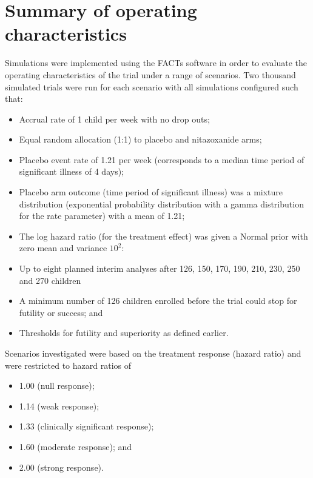 \documentclass[a4paper]{article}
\begin{document}
\section{Summary of operating characteristics}\label{summary-of-operating-characteristics}

Simulations were implemented using the FACTs software \cite{facts} in order to evaluate the operating characteristics of the trial under a range of scenarios.
Two thousand simulated trials were run for each scenario with all simulations configured such that:

\begin{itemize}
    \item Accrual rate of 1 child per week with no drop outs;
    \item Equal random allocation (1:1) to placebo and nitazoxanide arms;
    \item Placebo event rate of 1.21 per week (corresponds to a median time period of significant illness of 4 days);
    \item Placebo arm outcome (time period of significant illness) was a mixture distribution (exponential probability distribution with a gamma distribution for the rate parameter) with a mean of 1.21;
    \item The log hazard ratio (for the treatment effect) was given a Normal prior with zero mean and variance $10^2$: 
    \item Up to eight planned interim analyses after 126, 150, 170, 190, 210, 230, 250 and 270 children 
    \item A minimum number of 126 children enrolled before the trial could stop for futility or success; and 
    \item Thresholds for futility and superiority as defined earlier.
\end{itemize}

Scenarios investigated were based on the treatment response (hazard ratio) and were restricted to hazard ratios of

\begin{itemize}
    \item 1.00 (null response);
    \item 1.14 (weak response);
    \item 1.33 (clinically significant response);
    \item 1.60 (moderate response); and
    \item 2.00 (strong response).
\end{itemize}
\end{document}
